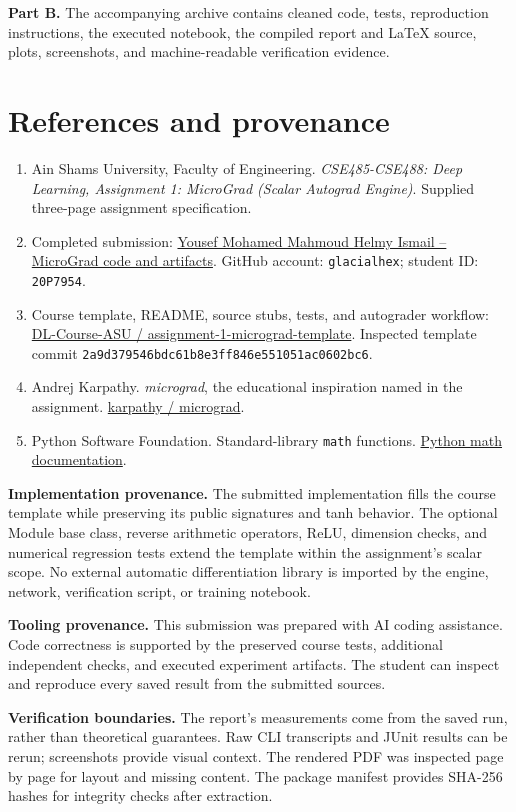 \documentclass[11pt,a4paper]{article}
\newcommand{\code}[1]{\texttt{#1}}
\begin{document}
\textbf{Part B.} The accompanying archive contains cleaned code, tests,
reproduction instructions, the executed notebook, the compiled report and
LaTeX source, plots, screenshots, and machine-readable verification evidence.
\clearpage

\section*{References and provenance}
\begin{enumerate}
\item Ain Shams University, Faculty of Engineering.
\emph{CSE485-CSE488: Deep Learning, Assignment 1: MicroGrad (Scalar
Autograd Engine)}. Supplied three-page assignment specification.
\item Completed submission:
\href{https://github.com/glacialhex/assignment-1-micrograd-template/tree/Yousef-Mohamed-Mahmoud-Helmy-Ismail_20P7954}{Yousef Mohamed Mahmoud Helmy Ismail -- MicroGrad code and artifacts}.
GitHub account: \code{glacialhex}; student ID: \code{20P7954}.
\item Course template, README, source stubs, tests, and autograder workflow:
\href{https://github.com/DL-Course-ASU/assignment-1-micrograd-template}{DL-Course-ASU / assignment-1-micrograd-template}.
Inspected template commit
\nolinkurl{2a9d379546bdc61b8e3ff846e551051ac0602bc6}.
\item Andrej Karpathy. \emph{micrograd}, the educational inspiration named in
the assignment. \href{https://github.com/karpathy/micrograd}{karpathy / micrograd}.
\item Python Software Foundation. Standard-library \code{math} functions.
\href{https://docs.python.org/3/library/math.html}{Python math documentation}.
\end{enumerate}
\textbf{Implementation provenance.} The submitted implementation fills the
course template while preserving its public signatures and tanh behavior.
The optional Module base class, reverse arithmetic operators, ReLU,
dimension checks, and numerical regression tests extend the template within
the assignment's scalar scope. No external automatic differentiation library
is imported by the engine, network, verification script, or training notebook.

\textbf{Tooling provenance.} This submission was prepared with AI coding
assistance. Code correctness is supported by the preserved course tests,
additional independent checks, and executed experiment artifacts. The student
can inspect and reproduce every saved result from the submitted sources.

\textbf{Verification boundaries.} The report's measurements come from the
saved run, rather than theoretical guarantees. Raw CLI transcripts and JUnit
results can be rerun; screenshots provide visual context. The rendered PDF
was inspected page by page for layout and missing content. The package
manifest provides SHA-256 hashes for integrity checks after extraction.
\end{document}

